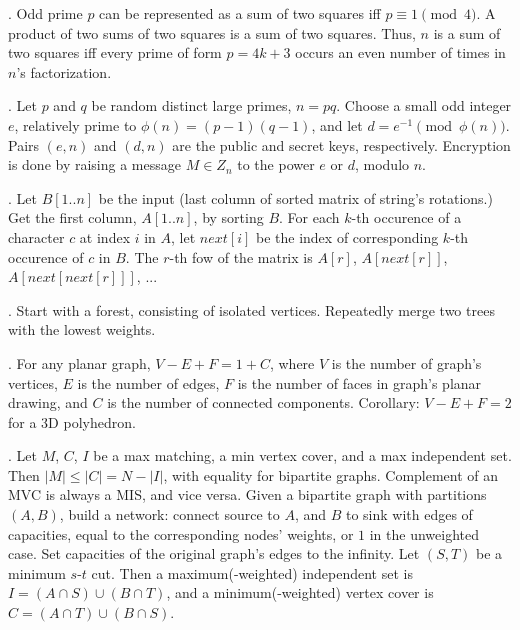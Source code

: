 .  Odd prime $p$ can be represented
as a sum of two squares iff $p \equiv 1 {\pmod 4}$.
A product of two sums of two squares is a sum of two squares.
Thus, $n$ is a sum of two squares iff every prime of
form $p=4k+3$ occurs an even number of times in $n$'s factorization.

. Let $p$ and $q$ be random distinct large primes, $n = pq$.
Choose a small odd integer $e$, relatively prime to $\phi(n) = (p-1)(q-1)$,
and let $d = e^{-1} \pmod{\phi(n)}$. Pairs $(e,n)$ and $(d,n)$ are
the public and secret keys, respectively.
Encryption is done by raising a message $M \in Z_n$ to the power $e$ or $d$,
modulo $n$.




.
Let $B[1..n]$ be the input (last column of sorted matrix of string's rotations.)
Get the first column, $A[1..n]$, by sorting $B$.
For each $k$-th occurence of a character $c$ at index $i$ in $A$,
let $next[i]$ be the index of corresponding $k$-th occurence of $c$ in $B$.
The $r$-th fow of the matrix is $A[r]$, $A[next[r]]$, $A[next[next[r]]]$, ...

.  Start with a forest, consisting of isolated
vertices.  Repeatedly merge two trees with the lowest weights.


. For any planar graph, $V - E + F = 1 + C$,
where $V$ is the number of graph's vertices, $E$ is the number of edges,
$F$ is the number of faces in graph's planar drawing, and $C$ is the number
of connected components.  Corollary: $V - E + F = 2$ for a 3D polyhedron.


.
Let $M$, $C$, $I$ be a max matching, a min vertex cover, and a max independent set.
Then $|M| \le |C| = N - |I|$, with equality for bipartite graphs.
Complement of an MVC is always a MIS, and vice versa.
Given a bipartite graph with partitions $(A, B)$, build a network:
connect source to $A$, and $B$ to sink with edges of capacities, equal to
the corresponding nodes' weights, or $1$ in the unweighted case.
Set capacities of the original graph's edges to the infinity.
Let $(S,T)$ be a minimum $s$-$t$ cut.
Then a maximum(-weighted) independent set is $I = (A \cap S) \cup (B \cap T)$,
and a minimum(-weighted) vertex cover is $C = (A \cap T) \cup (B \cap S)$.

